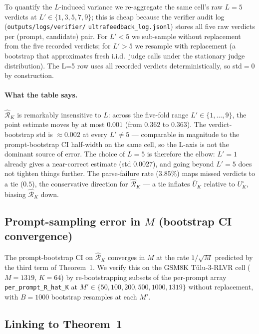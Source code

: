 To quantify the $L$-induced variance we re-aggregate the same cell's
raw $L=5$ verdicts at $L' \in \{1, 3, 5, 7, 9\}$; this is cheap because
the verifier audit log (\texttt{outputs/logs/verifier/}\allowbreak%
\texttt{ultrafeedback\_log.jsonl}) stores all five raw verdicts per
(prompt, candidate) pair. For $L'<5$ we sub-sample without
replacement from the five recorded verdicts; for $L'>5$ we resample
with replacement (a bootstrap that approximates fresh i.i.d.\ judge
calls under the stationary judge distribution). The L=5 row uses all
recorded verdicts deterministically, so std$=0$ by construction.



\paragraph{What the table says.}
$\hat{\mathcal R}_K$ is remarkably insensitive to $L$: across the
five-fold range $L' \in \{1, \ldots, 9\}$, the point estimate moves by
at most $0.001$ (from $0.362$ to $0.363$). The verdict-bootstrap std
is $\approx 0.002$ at every $L' \neq 5$ — comparable in magnitude
to the prompt-bootstrap CI half-width on the same cell, so the
L-axis is not the dominant source of error. The choice of $L=5$ is
therefore the elbow: $L'{=}1$ already gives a near-correct estimate
(std $0.0027$), and going beyond $L'{=}5$ does not tighten things
further. The parse-failure rate ($3.85\%$) maps missed verdicts to a
tie ($0.5$), the conservative direction for $\hat{\mathcal R}_K$ — a
tie inflates $\bar U_K$ relative to $U^\circ_K$, biasing $\hat{\mathcal R}_K$ down.

\subsection{Prompt-sampling error in \texorpdfstring{$M$}{M} (bootstrap CI convergence)}
\label{app:calibration:M}

The prompt-bootstrap CI on $\hat{\mathcal R}_K$ converges in $M$ at the rate
$1/\sqrt{M}$ predicted by the third term of Theorem~1. We verify this
on the GSM8K Tülu-3-RLVR cell ($M{=}1319$, $K{=}64$) by re-bootstrapping
subsets of the per-prompt array
\texttt{per\_prompt\_R\_hat\_K} at $M' \in \{50, 100, 200, 500, 1000, 1319\}$
without replacement, with $B{=}1000$ bootstrap resamples at each $M'$.



\subsection{Linking to Theorem~1}
\label{app:calibration:thm1}

